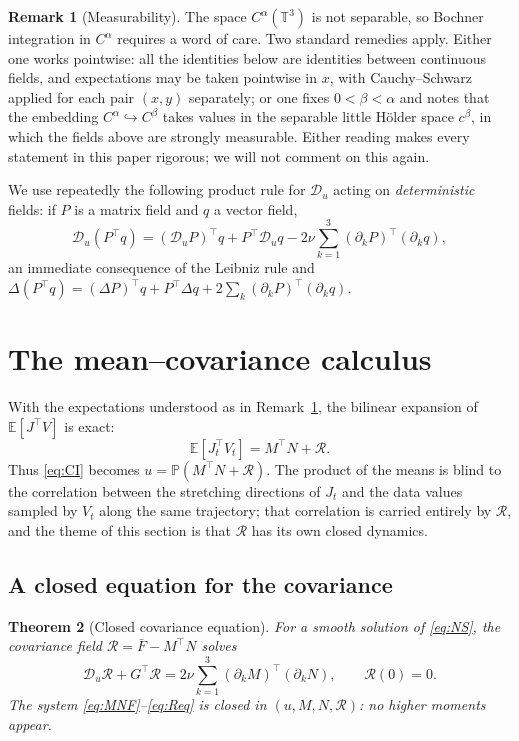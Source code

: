\documentclass[11pt,reqno]{amsart}
\newcommand{\T}{\mathbb{T}}
\newcommand{\E}{\mathbb{E}}
\newcommand{\Leray}{\mathbb{P}}
\newtheorem{theorem}{Theorem}[section]
\theoremstyle{definition}
\newtheorem{remark}[theorem]{Remark}
\begin{document}
\begin{remark}[Measurability]\label{rem:meas}
The space $C^\alpha(\T^3)$ is not separable, so Bochner integration in $C^\alpha$ requires
a word of care. Two standard remedies apply. Either one works pointwise: all the
identities below are identities between continuous fields, and expectations may be taken
pointwise in $x$, with Cauchy--Schwarz applied for each pair $(x,y)$ separately; or one
fixes $0<\beta<\alpha$ and notes that the embedding
$C^\alpha\hookrightarrow C^\beta$ takes values in the separable little H\"older space
$c^\beta$, in which the fields above are strongly measurable. Either reading makes every
statement in this paper rigorous; we will not comment on this again.
\end{remark}

We use repeatedly the following product rule for $\mathcal D_u$ acting on
\emph{deterministic} fields: if $P$ is a matrix field and $q$ a vector field,
\begin{equation}\label{eq:prodrule}
  \mathcal D_u(P^\top q)=(\mathcal D_uP)^\top q+P^\top\mathcal D_uq
  -2\nu\sum_{k=1}^3(\partial_kP)^\top(\partial_kq),
\end{equation}
an immediate consequence of the Leibniz rule and
$\Delta(P^\top q)=(\Delta P)^\top q+P^\top\Delta q+2\sum_k(\partial_kP)^\top(\partial_kq)$.

\section{The mean--covariance calculus}\label{sec:cov}

With the expectations understood as in Remark~\ref{rem:meas}, the bilinear expansion of
$\E[J^\top V]$ is exact:
\begin{equation}\label{eq:decomp}
  \E[J_t^\top V_t]=M^\top N+\mathcal R.
\end{equation}
Thus \eqref{eq:CI} becomes $u=\Leray(M^\top N+\mathcal R)$. The product of the means is
blind to the correlation between the stretching directions of $J_t$ and the data values
sampled by $V_t$ along the same trajectory; that correlation is carried entirely by
$\mathcal R$, and the theme of this section is that $\mathcal R$ has its own closed
dynamics.

\subsection{A closed equation for the covariance}

\begin{theorem}[Closed covariance equation]\label{thm:Req}
For a smooth solution of \eqref{eq:NS}, the covariance field
$\mathcal R=\bar F-M^\top N$ solves
\begin{equation}\label{eq:Req}
  \mathcal D_u\mathcal R+G^\top\mathcal R
  =2\nu\sum_{k=1}^3(\partial_kM)^\top(\partial_kN),\qquad \mathcal R(0)=0.
\end{equation}
The system \eqref{eq:MNF}--\eqref{eq:Req} is closed in $(u,M,N,\mathcal R)$: no higher
moments appear.
\end{theorem}
\end{document}
